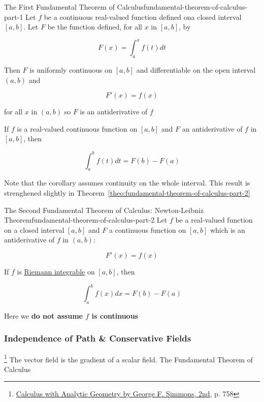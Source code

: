\begin{Theorem}{The First Fundamental Theorem of Calculus}{fundamental-theorem-of-calculus-part-1}
    Let $f$ be a continuous real-valued function defined ona closed interval $[a, b]$. Let $F$ be the function defined,
    for all $x$ in $[a, b]$, by

    \begin{equation}
        F(x) = \int_a^x f(t) dt
    \end{equation}

    Then $F$ is uniformly continuous on $[a, b]$ and differentiable on the open interval $(a, b)$ and

    \begin{equation}
        F'(x) = f(x)
    \end{equation}

    for all $x$ in $(a, b)$ so $F$ is an antiderivative of $f$
\end{Theorem}

\begin{Corollary}
    If $f$ is a real-valued continuous function on $[a, b]$ and $F$ an antiderivative of $f$ in $[a, b]$, then

    \begin{equation}
        \int_a^b f(t)dt = F(b) - F(a)
    \end{equation}

    Note that the corollary assumes continuity on the whole interval. This result is strenghened slightly in
    Theorem~\ref{theo:fundamental-theorem-of-calculus-part-2}
\end{Corollary}

\begin{Theorem}{The Second Fundamental Theorem of Calculus: Newton-Leibniz Theorem}{fundamental-theorem-of-calculus-part-2}
    Let $f$ be a real-valued function on a closed interval $[a, b]$ and $F$ a continuous function on $[a, b]$ which is
    an antiderivative of $f$ in $(a, b)$:

    \begin{equation}
        F'(x) = f(x)
    \end{equation}

    If $f$ is \hyperref[eq:riemann-integral]{Riemann integrable} on $[a, b]$, then

    \begin{equation}
        \int_a^b f(x)dx = F(b) - F(a)
    \end{equation}

    Here we \textbf{do not assume $f$ is continuous}
\end{Theorem}

\subsubsection{Independence of Path \& Conservative Fields}

\footnote{\href{https://trello.com/c/byu9Pyy8}{Calculus with Analytic Geometry by George F. Simmons, 2nd}, p. 758} The
vector field is the gradient of a scalar field. The Fundamental Theorem of Calculus